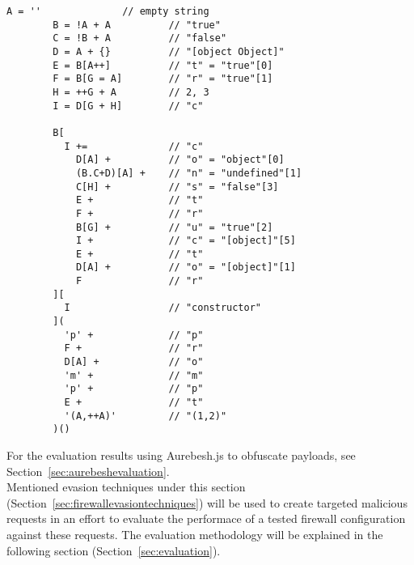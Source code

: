 \begin{lstlisting}[style=basicStyle, caption={Aurebesh.js obfuscation of prompt(1,2)}, label={lst:aurebeshprompt}]
		A = ''              // empty string
		B = !A + A          // "true"
		C = !B + A          // "false"
		D = A + {}          // "[object Object]"
		E = B[A++]          // "t" = "true"[0]
		F = B[G = A]        // "r" = "true"[1]
		H = ++G + A         // 2, 3
		I = D[G + H]        // "c"

		B[
		  I +=              // "c"
		    D[A] +          // "o" = "object"[0]
		    (B.C+D)[A] +    // "n" = "undefined"[1]
		    C[H] +          // "s" = "false"[3]
		    E +             // "t"
		    F +             // "r"
		    B[G] +          // "u" = "true"[2]
		    I +             // "c" = "[object]"[5]
		    E +             // "t"
		    D[A] +          // "o" = "[object]"[1]
		    F               // "r"
		][
		  I                 // "constructor"
		](
		  'p' +             // "p"
		  F +               // "r"
		  D[A] +            // "o"
		  'm' +             // "m"
		  'p' +             // "p"
		  E +               // "t"
		  '(A,++A)'         // "(1,2)"
		)()
\end{lstlisting}

For the evaluation results using Aurebesh.js to obfuscate payloads, see Section~\ref{sec:aurebeshevaluation}. \\

Mentioned evasion techniques under this section (Section~\ref{sec:firewallevasiontechniques}) will be used to create targeted malicious requests in an effort to evaluate the performace of a tested firewall configuration against these requests. The evaluation methodology will be explained in the following section (Section~\ref{sec:evaluation}).
